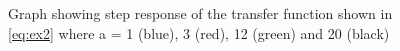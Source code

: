 \renewcommand{\ex}{ex3} 

\begin{figure}[ht!]
    \centering
    
    \caption{Graph showing step response of the transfer function shown in \eqref{eq:ex2} where a = 1 (blue), 3 (red), 12 (green) and 20 (black) }
    \label{fig:\ex}
\end{figure}\FloatBarrier